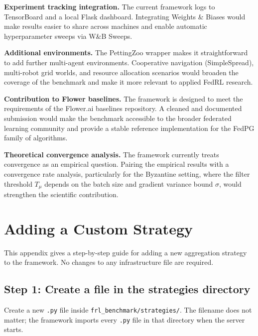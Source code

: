 \documentclass[a4paper, oneside]{discothesis}
\begin{document}
\textbf{Experiment tracking integration.} The current framework logs to TensorBoard and a local Flask dashboard. Integrating Weights \& Biases would make results easier to share across machines and enable automatic hyperparameter sweeps via W\&B Sweeps.

\textbf{Additional environments.} The PettingZoo wrapper makes it straightforward to add further multi-agent environments. Cooperative navigation (SimpleSpread), multi-robot grid worlds, and resource allocation scenarios would broaden the coverage of the benchmark and make it more relevant to applied FedRL research.

\textbf{Contribution to Flower baselines.} The framework is designed to meet the requirements of the Flower.ai baselines repository. A cleaned and documented submission would make the benchmark accessible to the broader federated learning community and provide a stable reference implementation for the FedPG family of algorithms.

\textbf{Theoretical convergence analysis.} The framework currently treats convergence as an empirical question. Pairing the empirical results with a convergence rate analysis, particularly for the Byzantine setting, where the filter threshold $T_\mu$ depends on the batch size and gradient variance bound $\sigma$, would strengthen the scientific contribution.




\appendix
\chapter{Adding a Custom Strategy}
\label{app:custom_strategy}

This appendix gives a step-by-step guide for adding a new aggregation strategy to the framework. No changes to any infrastructure file are required.

\section*{Step 1: Create a file in the strategies directory}

Create a new \texttt{.py} file inside \texttt{frl\_benchmark/strategies/}. The filename does not matter; the framework imports every \texttt{.py} file in that directory when the server starts.
\end{document}
